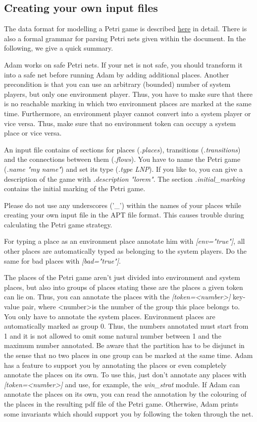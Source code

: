 \documentclass[runningheads]{./llncs/llncs}
\newcommand{\tool}{{\sc Adam}}
\begin{document}
\subsection{Creating your own input files}
The data format for modelling a Petri game is described \href{http://www.uni-oldenburg.de/fileadmin/user\_upload/f2inform-csd/adam/format.pdf}{here} in detail. There is also a formal grammar for parsing Petri nets given within the
document. In the following, we give a quick summary.

\tool{} works on safe Petri nets. If your net is not safe, you should transform it into a 
safe net before running \tool{} by adding additional places. Another precondition is that you
can use an arbitrary (bounded) number of system players, but only one environment player. 
Thus, you have to make sure that there is no reachable marking in which two environment 
places are marked at the same time. Furthermore, an environment player cannot convert into
a system player or vice versa. Thus, make sure that no environment token can occupy a 
system place or vice versa.

An input file contains of sections for places (\emph{.places}), transitions (\emph{.transitions}) 
and the connections between them (\emph{.flows}). You have to name the Petri game
(\emph{.name "my name"}) and set its type (\emph{.type LNP}). If you like to, you can give a 
description of the game with \emph{.description "lorem"}. The section \emph{.initial\_marking}
contains the initial marking of the Petri game.

Please do not use any underscores ('\_') within the names of your places while creating your
own input file in the APT file format. This causes trouble during calculating the Petri
game strategy.

For typing a place as an environment place annotate him with \emph{[env="true"]}, all other
places are automatically typed as belonging to the system players. Do the same for 
bad places with \emph{[bad="true"]}.

The places of the Petri game aren't just divided into environment and system places, but
also into groups of places stating these are the places a given token can lie on. Thus, 
you can annotate the places with the \emph{[token=\textless{}number\textgreater]} key-value pair, where \textless{}number\textgreater is 
the number of the group this place belongs to. You only have to annotate the system 
places. Environment places are automatically marked as group 0. Thus, the numbers
annotated must start from 1 and it is not allowed to omit some natural number between 1
and the maximum number annotated. Be aware that the partition has to be disjunct in the 
sense that no two places in one group can be marked at the same time. \tool{} has a feature 
to support you by annotating the places or even completely annotate the places on its own.
To use this, just don't annotate any places with \emph{[token=\textless{}number\textgreater{}]} and use, for example, 
the \emph{win\_strat} module. If \tool{} can annotate the places on its own, you can read the
annotation by the colouring of the places in the resulting pdf file of the Petri game.
Otherwise, \tool{} prints some invariants which should support you by following the token 
through the net.
\end{document}
